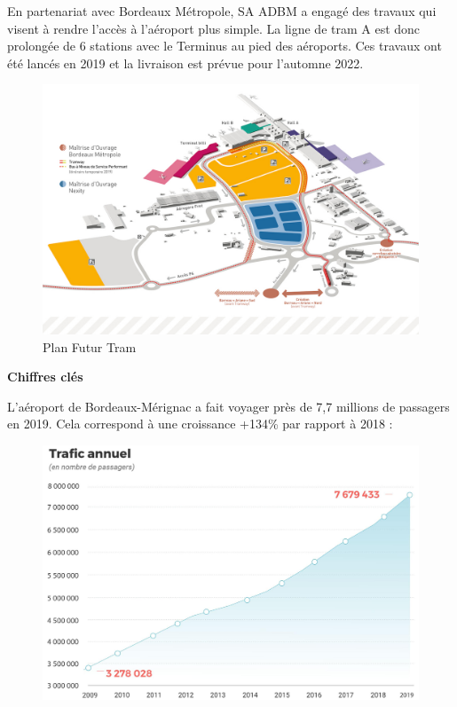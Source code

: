 En partenariat avec Bordeaux Métropole, SA ADBM a engagé des travaux qui visent à rendre l'accès à l'aéroport plus simple. La ligne de tram A est donc prolongée de 6 stations avec le Terminus au pied des aéroports. Ces travaux ont été lancés en 2019 et la livraison est prévue pour l'automne 2022.\newline

\begin{figure}[hbt!]
    \centering
    \includegraphics[width=16cm]{Images/tramway.jpg}
    \caption{Plan Futur Tram}
    \label{fig:futurtram}
\end{figure}

\newpage

\textbf{Chiffres clés}\newline

L'aéroport de Bordeaux-Mérignac a fait voyager près de 7,7 millions de passagers en 2019. Cela correspond à une croissance +134\% par rapport à 2018 :

\begin{figure}[hbt!]
    \centering
    \includegraphics[width=12cm]{Images/trafic.jpg}
    \label{fig:trafic}
\end{figure}

